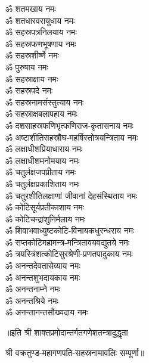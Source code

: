 \begin{multicols}{2}
\begin{flushleft}
ॐ शतमखाय नमः\\
ॐ शतधारवरायुधाय नमः\\
ॐ सहस्रपत्रनिलयाय नमः\\
ॐ सहस्रफणभूषणाय नमः\\
ॐ सहस्रशीर्ष्णे नमः\\
ॐ पुरुषाय नमः\\
ॐ सहस्राक्षाय नमः\\
ॐ सहस्रपदे नमः\\
ॐ सहस्रनामसंस्तुत्याय नमः\hfill{}\\
ॐ सहस्राक्षबलापहाय नमः\\
ॐ दशसाहस्रफणिभृत्फणिराज-कृतासनाय नमः\\
ॐ अष्टाशीतिसहस्रौघ-महर्षिस्तोत्रयन्त्रिताय नमः\\
ॐ लक्षाधीशप्रियाधाराय नमः\\
ॐ लक्षाधीशमनोमयाय नमः\\
ॐ चतुर्लक्षजपप्रीताय नमः\\
ॐ चतुर्लक्षप्रकाशिताय नमः\\
ॐ चतुरशीतिलक्षाणां जीवानां देहसंस्थिताय नमः\\
ॐ कोटिसूर्यप्रतीकाशाय नमः\\
ॐ कोटिचन्द्रांशुनिर्मलाय नमः\hfill{}\\
ॐ शिवाभवाध्युष्टकोटि-विनायकधुरन्धराय नमः\\
ॐ सप्तकोटिमहामन्त्र-मन्त्रितावयवद्युतये नमः\\
ॐ त्रयस्त्रिंशत्कोटिसुरश्रेणी-प्रणतपादुकाय नमः\\
ॐ अनन्तदेवतासेव्याय नमः\\
ॐ अनन्तशुभदायकाय नमः\\
ॐ अनन्तनाम्ने नमः\\
ॐ अनन्तश्रिये नमः\\
ॐ अनन्तानन्तसौख्यदाय नमः\\
\end{flushleft}
\end{multicols}
\centering
॥इति श्री शाक्तप्रमोदान्तर्गतगणेशतन्त्रादुद्धृता

श्री वक्रतुण्ड-महागणपति-सहस्रनामावलिः सम्पूर्णा॥
